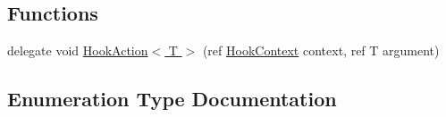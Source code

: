 \subsection*{Functions}
\begin{DoxyCompactItemize}
\item 
delegate void \hyperlink{namespaceOTA_1_1Plugin_a59f6f7fde9e7d8a453fbd75f0f86f880}{Hook\+Action$<$ T $>$} (ref \hyperlink{structOTA_1_1Plugin_1_1HookContext}{Hook\+Context} context, ref T argument)
\end{DoxyCompactItemize}


\subsection{Enumeration Type Documentation}
\hypertarget{namespaceOTA_1_1Plugin_a7c65b8c7c155fec0b559afbe2da809c0}{}
